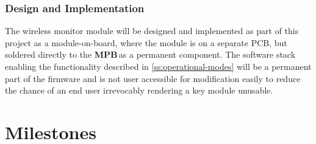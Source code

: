 \documentclass[letterpaper]{article}
\newcommand{\MPB}{\textbf{MPB}\,}
\begin{document}
\subsubsection{Design and Implementation}
The wireless monitor module will be designed and implemented as part of this project as a module-on-board, where the module is on a separate PCB, but soldered directly to the \MPB as a permanent component. The software stack enabling the functionality described in \ref{ss:operational-modes} will be a permanent part of the firmware and is not user accessible for modification easily to reduce the chance of an end user irrevocably rendering a key module unusable.



\section{Milestones}
\end{document}
